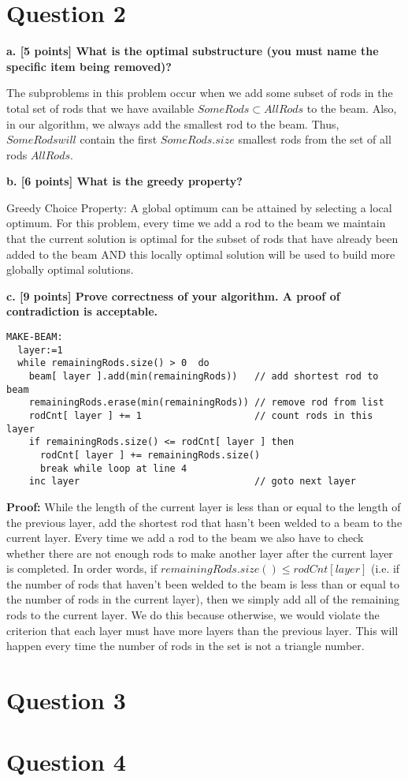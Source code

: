 \documentclass[12pt]{article}
\begin{document}
\section*{Question 2}
\textbf{a. [5 points] What is the optimal substructure (you must name the specific item being removed)?}

The subproblems in this problem occur when we add some subset of rods in the total set of rods that we have available $SomeRods \subset AllRods$ to the beam. Also, in our algorithm, we always add the smallest rod to the beam. Thus, $SomeRodswill$ contain the first $SomeRods.size$ smallest rods from the set of all rods $AllRods$. 

\noindent \textbf{b. [6 points] What is the greedy property? }

Greedy Choice Property: A global optimum can be attained by selecting a local optimum. For this problem, every time we add a rod to the beam we maintain that the current solution is optimal for the subset of rods that have already been added to the beam AND this locally optimal solution will be used to build more globally optimal solutions. 

\newpage
\noindent \textbf{c. [9 points] Prove correctness of your algorithm. A proof of contradiction is acceptable.}
\begin{lstlisting}[frame=single]
MAKE-BEAM:
  layer:=1                                                        
  while remainingRods.size() > 0  do 
    beam[ layer ].add(min(remainingRods))   // add shortest rod to beam
    remainingRods.erase(min(remainingRods)) // remove rod from list
    rodCnt[ layer ] += 1                    // count rods in this layer
    if remainingRods.size() <= rodCnt[ layer ] then
      rodCnt[ layer ] += remainingRods.size()
      break while loop at line 4
    inc layer                               // goto next layer
\end{lstlisting}

\textbf{Proof: } While the length of the current layer is less than or
equal to the length of the previous layer, add the shortest rod that hasn't 
been welded to a beam to the current layer. 
Every time we add a rod to the beam we also have to check whether there 
are not enough rods to make another layer after the current layer is completed. 
In order words, if $ remainingRods.size() \le rodCnt[ layer ] $
(i.e. if the number of rods that haven't been welded to the beam is less than 
or equal to the number of rods in the current layer), 
then we simply add all of the 
remaining rods to the current layer. We do this because otherwise, we would 
violate the criterion that each layer must have more layers than the 
previous layer. 
This will happen every time the number of rods in the set is not a triangle 
number.



\section*{Question 3}
\section*{Question 4}
\end{document}
